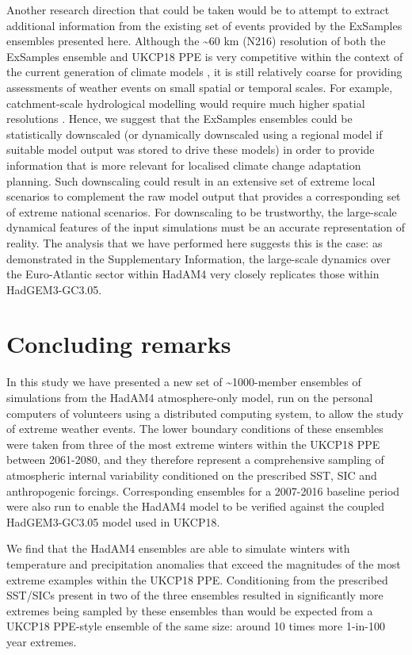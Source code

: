   Another research direction that could be taken would be to attempt to extract additional information from the existing set of events provided by the ExSamples ensembles presented here. Although the \textasciitilde60 km (N216) resolution of both the ExSamples ensemble and UKCP18 PPE is very competitive within the context of the current generation of climate models \citep{cmip6_source_id_values_cmip6_2022,eyring_overview_2016}, it is still relatively coarse for providing assessments of weather events on small spatial or temporal scales. For example, catchment-scale hydrological modelling would require much higher spatial resolutions \citep{charlton_assessing_2006}. Hence, we suggest that the ExSamples ensembles could be statistically downscaled (or dynamically downscaled using a regional model if suitable model output was stored to drive these models) in order to provide information that is more relevant for localised climate change adaptation planning. Such downscaling could result in an extensive set of extreme local scenarios to complement the raw model output that provides a corresponding set of extreme national scenarios. For downscaling to be trustworthy, the large-scale dynamical features of the input simulations must be an accurate representation of reality. The analysis that we have performed here suggests this is the case: as demonstrated in the Supplementary Information, the large-scale dynamics over the Euro-Atlantic sector within HadAM4 very closely replicates those within HadGEM3-GC3.05.
    
\section{Concluding remarks}

  In this study we have presented a new set of \textasciitilde1000-member ensembles of simulations from the HadAM4 atmosphere-only model, run on the personal computers of volunteers using a distributed computing system, to allow the study of extreme weather events. The lower boundary conditions of these ensembles were taken from three of the most extreme winters within the UKCP18 PPE between 2061-2080, and they therefore represent a comprehensive sampling of atmospheric internal variability conditioned on the prescribed SST, SIC and anthropogenic forcings. Corresponding ensembles for a 2007-2016 baseline period were also run to enable the HadAM4 model to be verified against the coupled HadGEM3-GC3.05 model used in UKCP18.
  
  We find that the HadAM4 ensembles are able to simulate winters with temperature and precipitation anomalies that exceed the magnitudes of the most extreme examples within the UKCP18 PPE. Conditioning from the prescribed SST/SICs present in two of the three ensembles resulted in significantly more extremes being sampled by these ensembles than would be expected from a UKCP18 PPE-style ensemble of the same size: around 10 times more 1-in-100 year extremes.
  
